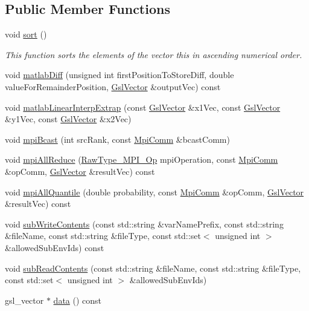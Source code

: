 \subsection*{Public Member Functions}
\begin{DoxyCompactItemize}
\item 
void \hyperlink{class_q_u_e_s_o_1_1_gsl_vector_ad4d0487806dd59f44a828ee228ba17b3}{sort} ()
\begin{DoxyCompactList}\small\item\em This function sorts the elements of the vector {\ttfamily this} in ascending numerical order. \end{DoxyCompactList}\item 
void \hyperlink{class_q_u_e_s_o_1_1_gsl_vector_aa4f5280c13c99ef028e7838887818c79}{matlab\-Diff} (unsigned int first\-Position\-To\-Store\-Diff, double value\-For\-Remainder\-Position, \hyperlink{class_q_u_e_s_o_1_1_gsl_vector}{Gsl\-Vector} \&output\-Vec) const 
\item 
void \hyperlink{class_q_u_e_s_o_1_1_gsl_vector_a6f463b2409b210989f45bb7c17cee3f7}{matlab\-Linear\-Interp\-Extrap} (const \hyperlink{class_q_u_e_s_o_1_1_gsl_vector}{Gsl\-Vector} \&x1\-Vec, const \hyperlink{class_q_u_e_s_o_1_1_gsl_vector}{Gsl\-Vector} \&y1\-Vec, const \hyperlink{class_q_u_e_s_o_1_1_gsl_vector}{Gsl\-Vector} \&x2\-Vec)
\item 
void \hyperlink{class_q_u_e_s_o_1_1_gsl_vector_aaa5bdbc03ef0ab86bad4b86b556a48d3}{mpi\-Bcast} (int src\-Rank, const \hyperlink{class_q_u_e_s_o_1_1_mpi_comm}{Mpi\-Comm} \&bcast\-Comm)
\item 
void \hyperlink{class_q_u_e_s_o_1_1_gsl_vector_acfd7f057bdb82b601086e6b56281659d}{mpi\-All\-Reduce} (\hyperlink{namespace_q_u_e_s_o_ab6a4008f3ba2b0196dae9e41971a9c18}{Raw\-Type\-\_\-\-M\-P\-I\-\_\-\-Op} mpi\-Operation, const \hyperlink{class_q_u_e_s_o_1_1_mpi_comm}{Mpi\-Comm} \&op\-Comm, \hyperlink{class_q_u_e_s_o_1_1_gsl_vector}{Gsl\-Vector} \&result\-Vec) const 
\item 
void \hyperlink{class_q_u_e_s_o_1_1_gsl_vector_a9c12f5d34643aa5d46f59570955339ab}{mpi\-All\-Quantile} (double probability, const \hyperlink{class_q_u_e_s_o_1_1_mpi_comm}{Mpi\-Comm} \&op\-Comm, \hyperlink{class_q_u_e_s_o_1_1_gsl_vector}{Gsl\-Vector} \&result\-Vec) const 
\item 
void \hyperlink{class_q_u_e_s_o_1_1_gsl_vector_ab222530a760b07f6c22eafe92585d8c5}{sub\-Write\-Contents} (const std\-::string \&var\-Name\-Prefix, const std\-::string \&file\-Name, const std\-::string \&file\-Type, const std\-::set$<$ unsigned int $>$ \&allowed\-Sub\-Env\-Ids) const 
\item 
void \hyperlink{class_q_u_e_s_o_1_1_gsl_vector_ae0047a01f01b4aaf3c67b716f4408932}{sub\-Read\-Contents} (const std\-::string \&file\-Name, const std\-::string \&file\-Type, const std\-::set$<$ unsigned int $>$ \&allowed\-Sub\-Env\-Ids)
\item 
gsl\-\_\-vector $\ast$ \hyperlink{class_q_u_e_s_o_1_1_gsl_vector_a6a668d6e6cdf69e3004e07742d066036}{data} () const 
\end{DoxyCompactItemize}
